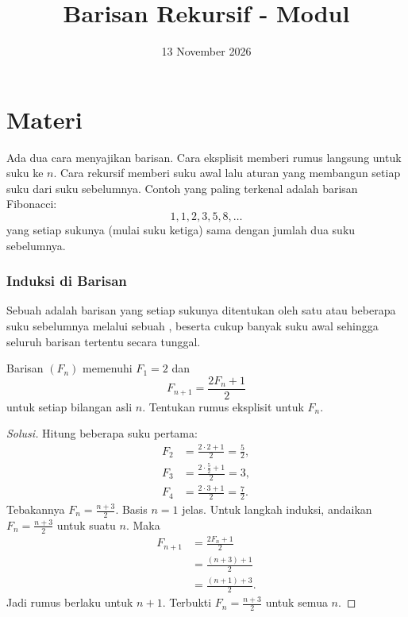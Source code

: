 \documentclass[12pt]{scrartcl}
\title{Barisan Rekursif - Modul}
\date{13 November 2026}
\begin{document}
\maketitle

\renewcommand*\contentsname{Daftar Isi}
\tableofcontents

\newpage

\part*{Materi}

Ada dua cara menyajikan barisan. Cara eksplisit memberi rumus langsung untuk
suku ke $n$. Cara rekursif memberi suku awal lalu aturan yang membangun setiap
suku dari suku sebelumnya. Contoh yang paling terkenal adalah barisan Fibonacci:
\[ 1, 1, 2, 3, 5, 8, \dots \]
yang setiap sukunya (mulai suku ketiga) sama dengan jumlah dua suku sebelumnya.

\section{Induksi di Barisan}

\begin{definition}
Sebuah  adalah barisan yang
setiap sukunya ditentukan oleh satu atau beberapa suku sebelumnya melalui
sebuah , beserta cukup banyak
suku awal sehingga seluruh barisan tertentu secara tunggal.
\end{definition}

\begin{example}
Barisan $(F_n)$ memenuhi $F_1 = 2$ dan
\[ F_{n+1} = \frac{2F_n + 1}{2} \]
untuk setiap bilangan asli $n$. Tentukan rumus eksplisit untuk $F_n$.
\end{example}
\begin{proof}[Solusi]
\renewcommand{\qedsymbol}{$\blacksquare$}
Hitung beberapa suku pertama:
\begin{align*}
F_2 &= \frac{2 \cdot 2 + 1}{2} = \frac{5}{2}, \\
F_3 &= \frac{2 \cdot \frac{5}{2} + 1}{2} = 3, \\
F_4 &= \frac{2 \cdot 3 + 1}{2} = \frac{7}{2}.
\end{align*}
Tebakannya $F_n = \frac{n+3}{2}$. Basis $n = 1$ jelas.
Untuk langkah induksi, andaikan $F_n = \frac{n+3}{2}$ untuk suatu $n$.
Maka
\begin{align*}
F_{n+1} &= \frac{2F_n + 1}{2} \\
&= \frac{(n + 3) + 1}{2} \\
&= \frac{(n + 1) + 3}{2}.
\end{align*}
Jadi rumus berlaku untuk $n + 1$. Terbukti $F_n = \frac{n+3}{2}$ untuk semua $n$.
\end{proof}
\end{document}
